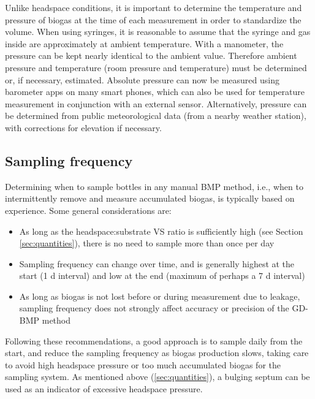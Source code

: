 \documentclass[]{article}
\begin{document}
Unlike headspace conditions, it is important to determine the temperature and pressure of biogas at the time of each measurement in order to standardize the volume.
When using syringes, it is reasonable to assume that the syringe and gas inside are approximately at ambient temperature.
With a manometer, the pressure can be kept nearly identical to the ambient value.
Therefore ambient pressure and temperature (room pressure and temperature) must be determined or, if necessary, estimated.
Absolute pressure can now be measured using barometer apps on many smart phones, which can also be used for temperature measurement in conjunction with an external sensor.
Alternatively, pressure can be determined from public meteorological data (from a nearby weather station), with corrections for elevation if necessary.

\subsection{Sampling frequency}
\label{sec:freq}

Determining when to sample bottles in any manual BMP method, i.e., when to intermittently remove and measure accumulated biogas, is typically based on experience. 
Some general considerations are:
\begin{itemize}
	\item As long as the headspace:substrate VS ratio is sufficiently high (see Section \ref{sec:quantities}), there is no need to sample more than once per day
  \item Sampling frequency can change over time, and is generally highest at the start (1 d interval) and low at the end (maximum of perhaps a 7 d interval)
  \item As long as biogas is not lost before or during measurement due to leakage, sampling frequency does not strongly affect accuracy or precision of the GD-BMP method
\end{itemize}

Following these recommendations, a good approach is to sample daily from the start, and reduce the sampling frequency as biogas production slows, taking care to avoid high headspace pressure or too much accumulated biogas for the sampling system.
As mentioned above (\ref{sec:quantities}), a bulging septum can be used as an indicator of excessive headspace pressure.
\end{document}
